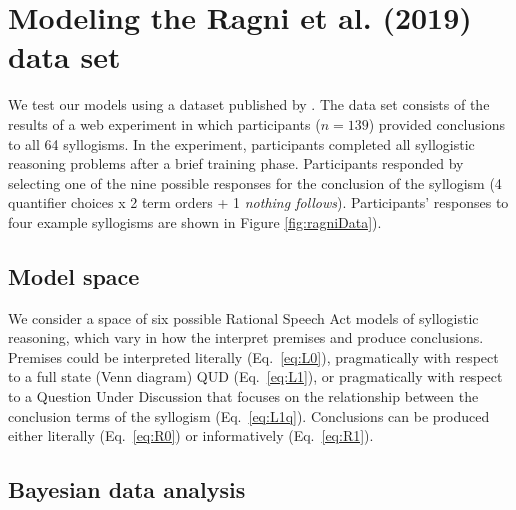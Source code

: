 \documentclass[floatsintext, doc]{apa6}
\begin{document}


\section{Modeling the Ragni et al. (2019) data set}

We test our models using a dataset published by . The data set consists of the results of a web experiment in which participants ($n = 139$) provided conclusions to all 64 syllogisms. In the experiment, participants completed all syllogistic reasoning problems after a brief training phase. Participants responded by selecting one of the nine possible responses for the conclusion of the syllogism (4 quantifier choices x 2 term orders + 1 \emph{nothing follows}).
Participants' responses to four example syllogisms are shown in Figure \ref{fig:ragniData}).


\subsection{Model space}

We consider a space of six possible Rational Speech Act models of syllogistic reasoning, which vary in how the interpret premises and produce conclusions. 
Premises could be interpreted literally (Eq.~\ref{eq:L0}), pragmatically with respect to a full state (Venn diagram) QUD (Eq.~\ref{eq:L1}), or pragmatically with respect to a Question Under Discussion that focuses on the relationship between the conclusion terms of the syllogism (Eq.~\ref{eq:L1q}).
Conclusions can be produced either literally (Eq.~\ref{eq:R0}) or informatively (Eq.~\ref{eq:R1}).


\subsection{Bayesian data analysis}
\end{document}
